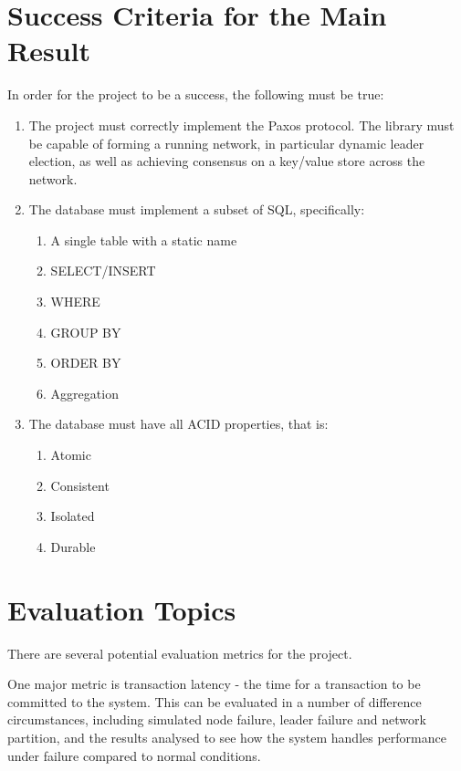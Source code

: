 \section*{Success Criteria for the Main Result}

In order for the project to be a success, the following must be true:

\begin{enumerate}

\item The project must correctly implement the Paxos protocol.
	The library must be capable of forming a running network,
	in particular dynamic leader election,
	as well as achieving consensus on a key/value store across the network.

\item The database must implement a subset of SQL, specifically:
\begin{enumerate}
\item A single table with a static name
\item SELECT/INSERT
\item WHERE
\item GROUP BY
\item ORDER BY
\item Aggregation
\end{enumerate}

\item The database must have all ACID properties, that is:
\begin{enumerate}
\item Atomic
\item Consistent
\item Isolated
\item Durable
\end{enumerate}

\end{enumerate}

\section*{Evaluation Topics}

There are several potential evaluation metrics for the project.

One major metric is transaction latency - the time for a transaction to be committed to the system. This
can be evaluated in a number of difference circumstances, including simulated node failure, leader
failure and network partition, and the results analysed to see how the system handles performance
under failure compared to normal conditions.

